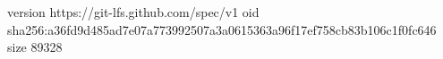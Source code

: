 version https://git-lfs.github.com/spec/v1
oid sha256:a36fd9d485ad7e07a773992507a3a0615363a96f17ef758cb83b106c1f0fc646
size 89328
